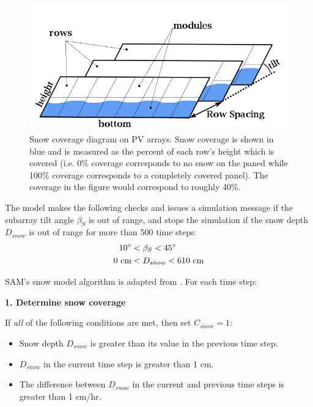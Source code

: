 \documentclass[12pt,letterpaper]{article}
\begin{document}
\begin{figure}
\begin{center}
\includegraphics[scale=0.5]{snow-coverage-diagram}
\caption{Snow coverage diagram on PV arrays. Snow coverage is shown in blue and is measured as the percent of each row's height which is covered (i.e. 0\% coverage corresponds to no snow on the paned while 100\% coverage corresponds to a completely covered panel). The coverage in the figure would correspond to roughly 40\%.}
\label{fig-snowCoverage}
\end{center}
\end{figure}

The model makes the following checks and issues a simulation message if the subarray tilt angle $\beta_S$ is out of range, and stops the simulation if the snow depth $D_{snow}$ is out of range for more than 500 time steps:
\begin{align*}
10^\circ &< \beta_{S} < 45^\circ \notag \\
0~\text{cm} &< D_{snow} < 610~\text{cm}
\end{align*}

SAM's snow model algorithm is adapted from \citet{marion-snowmodel}. For each time step:

\textbf{1. Determine snow coverage}

If \textit{all} of the following conditions are met, then set $C_{snow}=1$:

\begin{itemize}
\item Snow depth $D_{snow}$ is greater than its value in the previous time step.
\item $D_{snow}$ in the current time step is greater than 1 cm.
\item The difference between $D_{snow}$ in the current and previous time steps is greater than 1 cm/hr.
\end{itemize}
\end{document}
